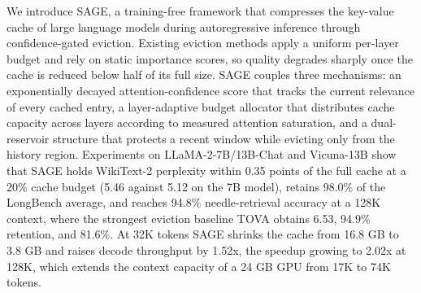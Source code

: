 We introduce SAGE, a training-free framework that compresses the
key-value cache of large language models during autoregressive inference
through confidence-gated eviction. Existing eviction methods apply a
uniform per-layer budget and rely on static importance scores, so
quality degrades sharply once the cache is reduced below half of its
full size. SAGE couples three mechanisms: an exponentially decayed
attention-confidence score that tracks the current relevance of every
cached entry, a layer-adaptive budget allocator that distributes cache
capacity across layers according to measured attention saturation, and
a dual-reservoir structure that protects a recent window while evicting
only from the history region. Experiments on LLaMA-2-7B/13B-Chat and Vicuna-13B show
that SAGE holds WikiText-2 perplexity within 0.35 points of the full
cache at a 20\% cache budget (5.46 against 5.12 on the 7B model),
retains 98.0\% of the LongBench average, and reaches 94.8\%
needle-retrieval accuracy at a 128K context, where the strongest
eviction baseline TOVA obtains 6.53, 94.9\% retention, and 81.6\%. At 32K tokens SAGE shrinks the cache from
16.8 GB to 3.8 GB and raises decode throughput by 1.52x, the speedup
growing to 2.02x at 128K, which extends the context capacity of a 24 GB
GPU from 17K to 74K tokens.
